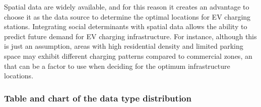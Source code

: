 Spatial data are widely available, and for this reason it creates an advantage to choose it as the data source to determine the optimal locations for EV charging stations. Integrating social determinants with spatial data allows the ability to predict future demand for EV charging infrastructure. For instance, although this is just an assumption, areas with high residential density and limited parking space may exhibit different charging patterns compared to commercial zones, an that can be a factor to use when deciding for the optimum infrastructure locations.


\subsubsection{Table and chart of the data type distribution}


